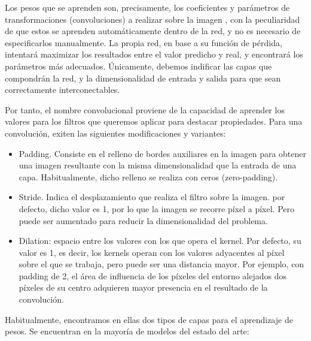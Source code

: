 Los pesos que se aprenden son, precisamente, los coeficientes y parámetros de transformaciones (convoluciones) a realizar sobre la imagen , con la peculiaridad de que estos se aprenden automáticamente dentro de la red, y no es necesario de especificarlos manualmente. La propia red, en base a su función de pérdida, intentará maximizar los resultados entre el valor predicho y real, y encontrará los parámetros más adecuados. Únicamente, debemos indificar las capas que compondrán la red, y la dimensionalidad de entrada y salida para que sean correctamente interconectables.

Por tanto, el nombre convolucional proviene de la capacidad de aprender los valores para los filtros que queremos aplicar para destacar propiedades. Para una convolución, exiten las siguientes modificaciones y variantes:

\begin{itemize}

	\item  Padding. Consiste en el relleno de bordes auxiliares en la imagen para obtener una imagen resultante con la misma dimensionalidad que la entrada de una capa. Habitualmente, dicho relleno se realiza con ceros (zero-padding).
	\item  Stride. Indica el desplazamiento que realiza el filtro sobre la imagen. por defecto, dicho valor es 1, por lo que la imagen se recorre píxel a píxel. Pero puede ser aumentado para reducir la dimensionalidad del problema.
	\item Dilation: espacio entre los valores con los que opera el kernel. Por defecto, su valor es 1, es decir, los kernels operan con los valores adyacentes al píxel sobre el que se trabaja, pero puede ser una distancia mayor. Por ejemplo, con padding de 2, el área de influencia de los píxeles del entorno alejados dos píxeles de su centro adquieren mayor presencia en el resultado de la convolución.

\end{itemize}



Habitualmente, encontramos en ellas dos tipos de capas para el aprendizaje de pesos. Se encuentran en la mayoría de modelos del estado del arte:

